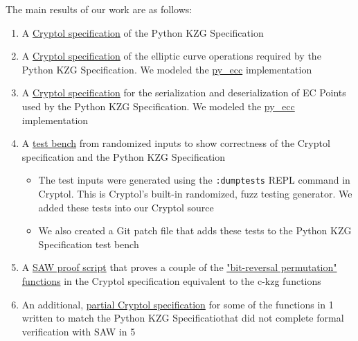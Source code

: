 \documentclass[12pt]{galois-whitepaper}
\begin{document}
The main results of our work are as follows:
\begin{enumerate}
    \item A \href{https://github.com/GaloisInc/ckzg-eip-4844-verification/tree/main/spec/Spec}{Cryptol specification}
          of the Python KZG Specification
    \item A \href{https://github.com/GaloisInc/ckzg-eip-4844-verification/tree/main/spec/Spec/BlsEC}{Cryptol specification}
          of the elliptic curve operations required by the Python KZG Specification.
          We modeled the \href{https://github.com/ethereum/py_ecc}{py\_ecc} implementation
    \item A \href{https://github.com/GaloisInc/ckzg-eip-4844-verification/blob/main/spec/Spec/BlsSerde.cry}{Cryptol specification}
          for the serialization and deserialization of EC Points used by the Python KZG Specification.
          We modeled the \href{https://github.com/ethereum/py_ecc}{py\_ecc} implementation
    \item A \href{https://github.com/GaloisInc/ckzg-eip-4844-verification/tree/main/spec/TestVectors}{test bench}
          from randomized inputs to show correctness of the Cryptol specification and the Python KZG Specification
          \begin{itemize}
                \item The test inputs were generated using the \texttt{:dumptests} REPL command in Cryptol.
                This is Cryptol's built-in randomized, fuzz testing generator. We added these tests into our Cryptol source
                \item We also created a Git patch file that adds these tests to the Python KZG Specification test bench
          \end{itemize}
    \item A \href{https://github.com/GaloisInc/ckzg-eip-4844-verification/tree/main/proof}{SAW proof script}
          that proves a couple of the \href{https://github.com/ethereum/consensus-specs/blob/dev/specs/deneb/polynomial-commitments.md\#bit-reversal-permutation}
          {"bit-reversal permutation" functions} in the Cryptol specification equivalent to the c-kzg functions
    \item An additional, \href{https://github.com/GaloisInc/ckzg-eip-4844-verification/tree/main/spec/LLVM}{partial Cryptol specification}
          for some of the functions in 1 written to match the Python KZG Specificatiothat did not complete
          formal verification with SAW in 5
\end{enumerate}
\end{document}
